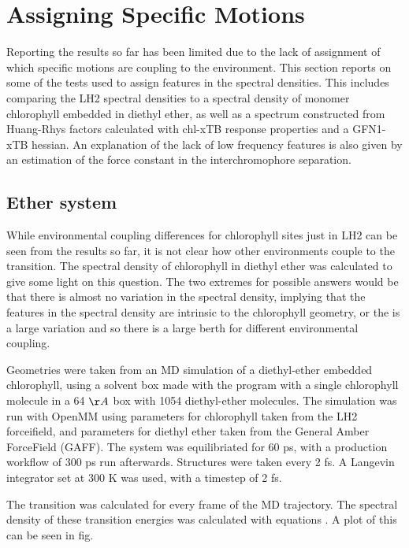 \section{Assigning Specific Motions}
\label{sec:monomer_dimer_assign}

Reporting the results so far has been limited due to the lack of assignment of which
specific motions are coupling to the environment. This section reports on some of
the tests used to assign features in the spectral densities. This includes comparing
the LH2 spectral densities to a spectral density of monomer chlorophyll embedded
in diethyl ether, as well as a spectrum constructed from Huang-Rhys factors calculated
with chl-xTB response properties and a GFN1-xTB hessian. An explanation of the 
lack of low frequency features is also given by an estimation of the force constant
in the interchromophore separation.

\subsection{Ether system}
\label{subsec:specdens_ether}

While environmental coupling differences for chlorophyll sites just in LH2 can be
seen from the results so far, it is not clear how other environments couple to the 
\Qy transition. The spectral density of chlorophyll in diethyl ether was calculated
to give some light on this question. The two extremes for possible answers would
be that there is almost no variation in the spectral density, implying that the 
features in the spectral density are intrinsic to the chlorophyll geometry, or the
is a large variation and so there is a large berth for different environmental coupling. 

Geometries were taken from an MD simulation of a diethyl-ether embedded chlorophyll, 
using a solvent box made with the  program with a single chlorophyll 
molecule in a 64 $\AA{}$ box with 1054 diethyl-ether molecules. The simulation was
run with OpenMM using parameters for chlorophyll taken from the LH2 forceifield,
and parameters for diethyl ether taken from the General Amber ForceField (GAFF).
The system was equilibriated for 60 ps, with a production workflow of 300 ps run 
afterwards. Structures were taken every 2 fs. A Langevin integrator set at 300 K
was used, with a timestep of 2 fs.

The \Qy transition was calculated for every frame of the MD trajectory. The spectral
density of these transition energies was calculated with equations . A plot of this 
can be seen in fig.

